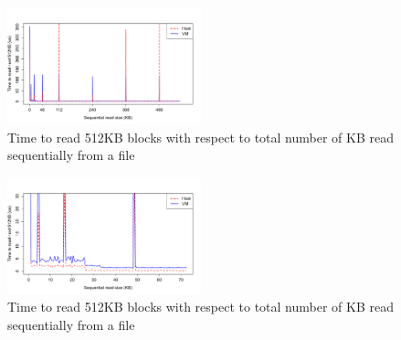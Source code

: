 \begin{figure}[h]
	\includegraphics[width=0.5\textwidth]{./figures/p2_big.pdf}
	\caption{Time to read 512KB blocks with respect to total number of KB read sequentially from a file}
	\label{fig:p2_graph_big}
\end{figure}

\begin{figure}[h]
	\includegraphics[width=0.5\textwidth]{./figures/p2_small.pdf}
	\caption{Time to read 512KB blocks with respect to total number of KB read sequentially from a file}
	\label{fig:p2_graph_small}
\end{figure}




